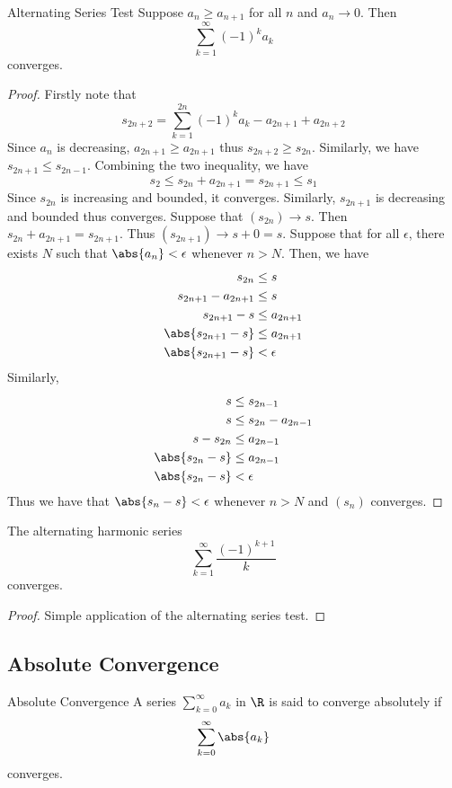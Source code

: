 \begin{thm}{Alternating Series Test}{} Suppose $a_n\geq a_{n+1}$ for all $n$ and $a_n\to0$. Then $$\sum_{k=1}^{\infty}(-1)^ka_k$$ converges. \tcbline
\begin{proof} Firstly note that $$s_{2n+2}=\sum_{k=1}^{2n}(-1)^ka_k-a_{2n+1}+a_{2n+2}$$ Since $a_n$ is decreasing, $a_{2n+1}\geq a_{2n+1}$ thus $s_{2n+2}\geq s_{2n}$. Similarly, we have $s_{2n+1}\leq s_{2n-1}$. Combining the two inequality, we have $$s_2\leq s_{2n}+a_{2n+1}=s_{2n+1}\leq s_1$$ Since $s_{2n}$ is increasing and bounded, it converges. Similarly, $s_{2n+1}$ is decreasing and bounded thus converges. Suppose that $(s_{2n})\to s$. Then $s_{2n}+a_{2n+1}=s_{2n+1}$. Thus $(s_{2n+1})\to s+0=s$. Suppose that for all $\epsilon$, there exists $N$ such that $\abs{a_{n}}<\epsilon$ whenever $n>N$. Then, we have
\begin{align*}
s_{2n}&\leq s\\
s_{2n+1}-a_{2n+1}&\leq s\\
s_{2n+1}-s&\leq a_{2n+1}\\
\abs{s_{2n+1}-s}&\leq a_{2n+1}\\
\abs{s_{2n+1}-s}&<\epsilon\\
\end{align*}
Similarly, 
\begin{align*}
s&\leq s_{2n-1}\\
s&\leq s_{2n}-a_{2n-1}\\
s-s_{2n}&\leq a_{2n-1}\\
\abs{s_{2n}-s}&\leq a_{2n-1}\\
\abs{s_{2n}-s}&<\epsilon\\
\end{align*}
Thus we have that $\abs{s_n-s}<\epsilon$ whenever $n>N$ and $(s_n)$ converges. 
\end{proof}
\end{thm}

\begin{lmm}{}{} The alternating harmonic series $$\sum_{k=1}^{\infty}\frac{(-1)^{k+1}}{k}$$ converges. \tcbline
\begin{proof} Simple application of the alternating series test. 
\end{proof}
\end{lmm}

\subsection{Absolute Convergence}
\begin{defn}{Absolute Convergence}{} A series $\sum_{k=0}^\infty a_k$ in $\R$ is said to converge absolutely if $$\sum_{k=0}^\infty\abs{a_k}$$ converges.
\end{defn}

